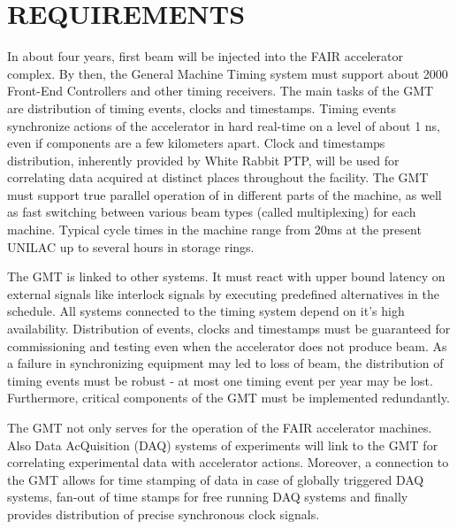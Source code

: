 \section{REQUIREMENTS}

In  about  four years,  first  beam will  be  injected  into the  FAIR
accelerator complex. By then,  the General Machine Timing system
must support about 2000  Front-End Controllers and other timing
receivers. The main tasks of the GMT are distribution of  timing
events, clocks  and timestamps.  Timing events  synchronize actions of
the accelerator in hard real-time on a level of about 1 ns, even if
components are a few kilometers apart. Clock and timestamps
distribution, inherently  provided by White  Rabbit PTP, will  be used
for  correlating  data  acquired  at distinct  places  throughout  the
facility. The GMT must support true parallel operation of in different
parts of the  machine, as well as fast  switching between various beam
types (called multiplexing) for  each machine.  Typical cycle times in
the machine range from 20ms at  the present UNILAC up to several hours
in storage rings.

The GMT  is linked to other  systems.  It must react  with upper bound
latency  on  external  signals  like interlock  signals  by  executing
predefined alternatives in the  schedule. All systems connected to the
timing  system  depend on  it's  high  availability.  Distribution  of
events, clocks and timestamps  must be guaranteed for commissioning and
testing even when the accelerator  does not produce beam. As a failure
in synchronizing equipment  may led to loss of  beam, the distribution
of timing  events must be robust -  at most one timing  event per year
may  be lost.  Furthermore, critical  components  of the  GMT must  be
implemented redundantly.

The  GMT not only  serves for  the operation  of the  FAIR accelerator
machines. Also Data AcQuisition (DAQ) systems of experiments will link
to  the  GMT  for   correlating  experimental  data  with  accelerator
actions. Moreover, a connection to the GMT allows for time stamping of
data in case of globally triggered DAQ systems, fan-out of time stamps
for  free running  DAQ systems  and finally  provides  distribution of
precise synchronous clock signals.
